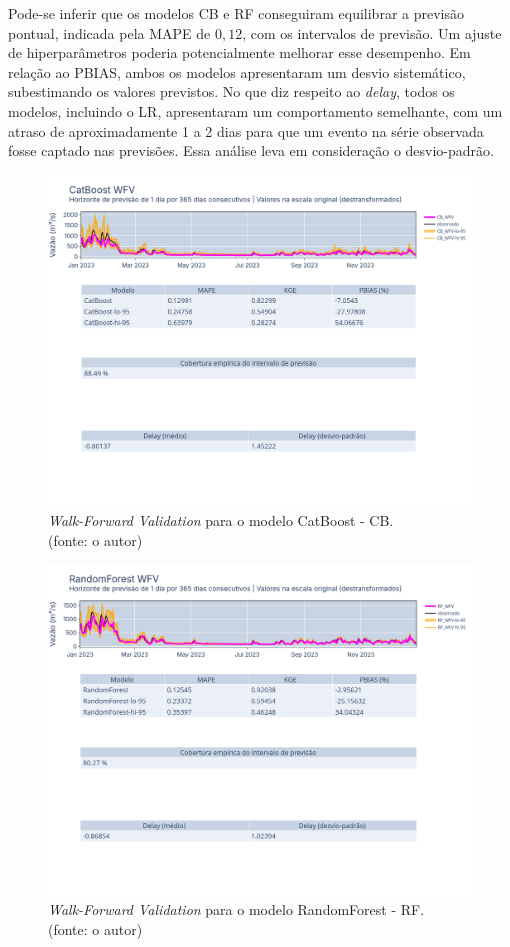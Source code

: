 Pode-se inferir que os modelos CB e RF conseguiram equilibrar a previsão pontual, indicada pela MAPE de $0,12$, com os intervalos de previsão. Um ajuste de hiperparâmetros poderia potencialmente melhorar esse desempenho. Em relação ao PBIAS, ambos os modelos apresentaram um desvio sistemático, subestimando os valores previstos. No que diz respeito ao \textit{delay}, todos os modelos, incluindo o LR, apresentaram um comportamento semelhante, com um atraso de aproximadamente 1 a 2 dias para que um evento na série observada fosse captado nas previsões. Essa análise leva em consideração o desvio-padrão.

\begin{figure}[!h]
\centering
\includegraphics[scale=0.33]{Figuras/jequiti/resultados/CB_WFV_LOG.png}
\caption{\textit{Walk-Forward Validation} para o modelo CatBoost - CB.\\(fonte: o autor)}
\label{fig:jequiti_CB_WFV_LOG}
\end{figure}

\begin{figure}[!h]
\centering
\includegraphics[scale=0.33]{Figuras/jequiti/resultados/RF_WFV_LOG.png}
\caption{\textit{Walk-Forward Validation} para o modelo RandomForest - RF.\\(fonte: o autor)}
\label{fig:jequiti_RF_WFV_LOG}
\end{figure}
\clearpage

